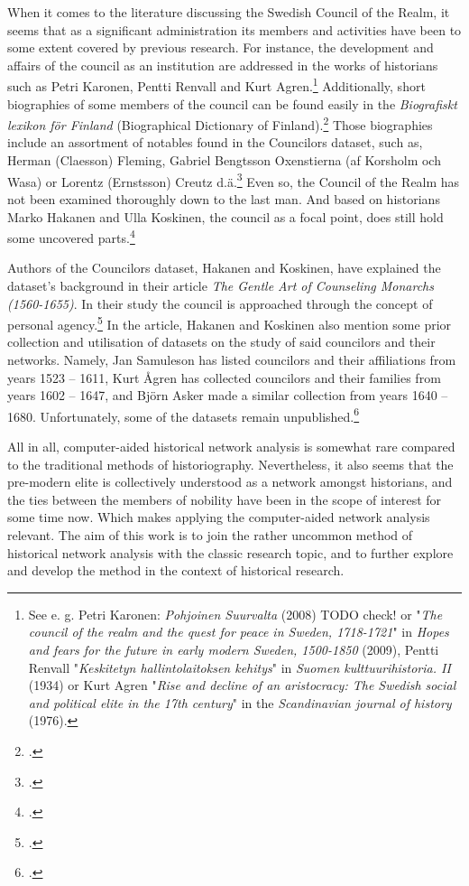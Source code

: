 \documentclass[a4paper,12pt]{article}
\begin{document}
\begin{onehalfspace}
When it comes to the literature discussing the Swedish Council of the Realm, it seems that as a significant administration its members and activities have been to some extent covered by previous research. For instance, the development and affairs of the council as an institution are addressed in the works of historians such as Petri Karonen, Pentti Renvall and Kurt Agren.\footnote{See e. g. Petri Karonen: \textit{Pohjoinen Suurvalta} (2008) TODO check! or "\textit{The council of the realm and the quest for peace in Sweden, 1718-1721}" in \textit{Hopes and fears for the future in early modern Sweden, 1500-1850} (2009), Pentti Renvall "\textit{Keskitetyn hallintolaitoksen kehitys}" in \textit{Suomen kulttuurihistoria. II} (1934) or Kurt Agren "\textit{Rise and decline of an aristocracy: The Swedish social and political elite in the 17th century}" in the \textit{Scandinavian journal of history} (1976).} Additionally, short biographies of some members of the council can be found easily in the \textit{Biografiskt lexikon för Finland} (Biographical Dictionary of Finland).\footcite{blf} Those biographies include an assortment of notables found in the Councilors dataset, such as, Herman (Claesson) Fleming, Gabriel Bengtsson Oxenstierna (af Korsholm och Wasa) or Lorentz (Ernstsson) Creutz d.ä.\footcite{blf-list} Even so, the Council of the Realm has not been examined thoroughly down to the last man. And based on historians Marko Hakanen and Ulla Koskinen, the council as a focal point, does still hold some uncovered parts.\footcite[p. 47-48.]{HakanenAKoskinen2017} 

Authors of the Councilors dataset, Hakanen and Koskinen, have explained the dataset's background in their article \textit{The Gentle Art of Counseling Monarchs (1560-1655)}. In their study the council is approached through the concept of personal agency.\footcite{HakanenAKoskinen2017} In the article, Hakanen and Koskinen also mention some prior collection and utilisation of datasets on the study of said councilors and their networks. Namely, Jan Samuleson has listed councilors and their affiliations from years 1523 – 1611, Kurt Ågren has collected councilors and their families from years 1602 – 1647, and Björn Asker made a similar collection from years 1640 – 1680. Unfortunately, some of the datasets remain unpublished.\footcite[p. 48, 67 (cite 4).]{HakanenAKoskinen2017} 

All in all, computer-aided historical network analysis is somewhat rare compared to the traditional methods of historiography. Nevertheless, it also seems that the pre-modern elite is collectively understood as a network amongst historians, and the ties between the members of nobility have been in the scope of interest for some time now. Which makes applying the computer-aided network analysis relevant. The aim of this work is to join the rather uncommon method of historical network analysis with the classic research topic, and to further explore and develop the method in the context of historical research.


\end{onehalfspace}
\end{document}

